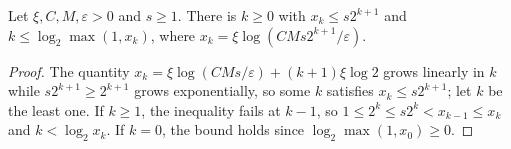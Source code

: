 \begin{lemma}
    \label{lem:ldp_mera_least_layers}
    \leanok
    Let $\xi,C,M,\varepsilon>0$ and $s\ge1$. There is $k\ge0$ with
    $x_k\le s2^{k+1}$ and $k\le\log_2\max(1,x_k)$, where
    $x_k=\xi\log(CMs2^{k+1}/\varepsilon)$.
\end{lemma}
\begin{proof}
    \leanok
    The quantity $x_k=\xi\log(CMs/\varepsilon)+(k+1)\xi\log2$ grows linearly in
    $k$ while $s2^{k+1}\ge2^{k+1}$ grows exponentially, so some $k$ satisfies
    $x_k\le s2^{k+1}$; let $k$ be the least one. If $k\ge1$, the inequality
    fails at $k-1$, so $1\le2^k\le s2^k<x_{k-1}\le x_k$ and $k<\log_2x_k$. If
    $k=0$, the bound holds since $\log_2\max(1,x_0)\ge0$.
\end{proof}

